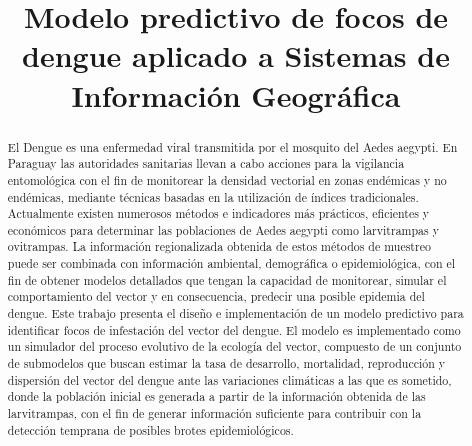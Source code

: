 \documentclass[conference]{IEEEtran}
\begin{document}
%
\title{Modelo predictivo de focos de dengue aplicado a Sistemas de Información Geográfica}


\author{
}

\maketitle

\begin{abstract}
El Dengue es una enfermedad viral transmitida por el mosquito del Aedes aegypti. En Paraguay las autoridades sanitarias llevan a cabo acciones para la vigilancia entomológica con el fin de monitorear la densidad vectorial en zonas endémicas y no endémicas, mediante técnicas basadas en la utilización de índices tradicionales. Actualmente existen numerosos métodos e indicadores más prácticos, eficientes y económicos para determinar las poblaciones de Aedes aegypti como larvitrampas y ovitrampas. La información regionalizada obtenida de estos métodos de muestreo puede ser combinada con información ambiental, demográfica o epidemiológica, con el fin de obtener modelos detallados que tengan la capacidad de monitorear, simular el comportamiento del vector y en consecuencia, predecir una posible epidemia del dengue. Este trabajo presenta el diseño e implementación de un modelo predictivo para identificar focos de infestación del vector del dengue. El modelo es implementado como un simulador del proceso evolutivo de la ecología del vector, compuesto de un conjunto de submodelos que buscan estimar la tasa de desarrollo, mortalidad, reproducción y dispersión del vector del dengue ante las variaciones climáticas a las que es sometido, donde la población inicial es generada a partir de la información obtenida de las larvitrampas, con el fin de generar información suficiente para contribuir con la detección temprana de posibles brotes epidemiológicos.
\end{abstract}
\end{document}
